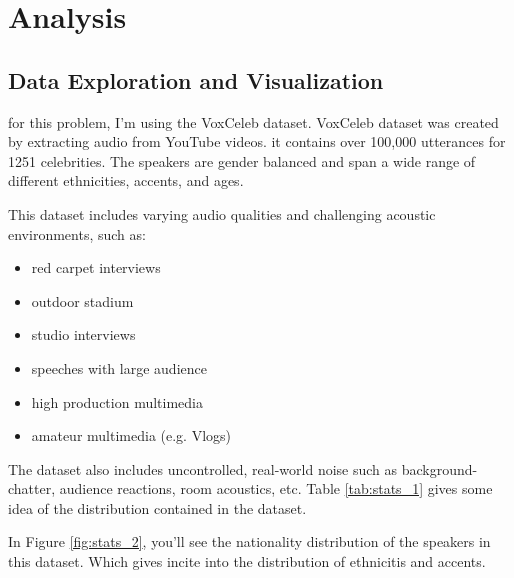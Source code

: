 \documentclass{article}
\begin{document}
\section{Analysis}

\subsection{Data Exploration and Visualization}

for this problem, I'm using the VoxCeleb dataset\cite{Nagrani17}.
VoxCeleb dataset was created by extracting audio from YouTube videos.
it contains over 100,000 utterances for 1251 celebrities. The speakers are gender balanced and span a wide range of different ethnicities, accents, and ages.


This dataset includes varying audio qualities and challenging acoustic environments, such as:
\begin{itemize}
    \item red carpet interviews
    \item outdoor stadium
    \item studio interviews
    \item speeches with large audience
    \item high production multimedia
    \item amateur multimedia (e.g. Vlogs)
\end{itemize}

The dataset also includes uncontrolled, real-world noise such as background-chatter, audience reactions, room acoustics, etc.
Table \ref{tab:stats_1} gives some idea of the distribution contained in the dataset.

In Figure \ref{fig:stats_2}, you'll see the nationality distribution of the speakers in this dataset. Which gives incite into the distribution of ethnicitis and accents. 
\end{document}
